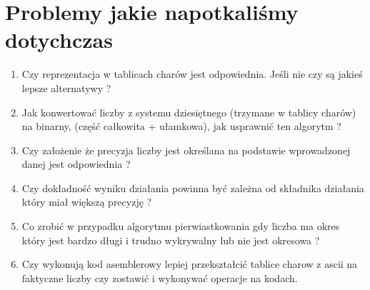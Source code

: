 \documentclass{article}
\begin{document}
\section{Problemy jakie napotkaliśmy dotychczas}
\begin{enumerate}
    \item Czy reprezentacja w tablicach charów jest odpowiednia. Jeśli nie czy są jakieś lepsze alternatywy ?
    \item Jak konwertować liczby z systemu dziesiętnego (trzymane w tablicy charów) na binarny, (część całkowita + ułamkowa), jak usprawnić ten algorytm ?
    \item Czy założenie że precyzja liczby jest określana na podstawie wprowadzonej danej jest odpowiednia ?
    \item Czy dokładność wyniku działania powinna być zależna od składnika działania który miał większą precyzję ?
    \item Co zrobić w przypadku algorytmu pierwiastkowania gdy liczba ma okres który jest bardzo długi i trudno wykrywalny  lub nie jest okresowa ?
    \item Czy wykonują kod asemblerowy lepiej przekształcić tablice charow z ascii na faktyczne liczby czy zostawić i wykonywać operacje na kodach.
\end{enumerate}
\end{document}
